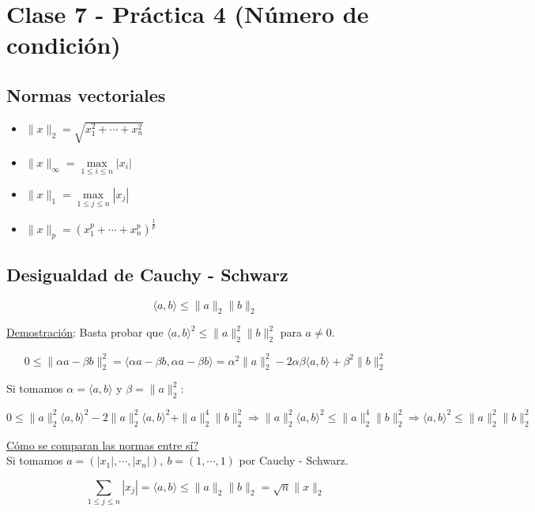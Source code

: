 \section{Clase 7 - Pr\'actica 4 (N\'umero de condici\'on)}

\subsection{Normas vectoriales}

\begin{itemize}
	\item $\|x\|_{2} = \sqrt{x_{1}^{2} + \cdots + x_{n}^{2}}$
	
	\item $\|x\|_{\infty} = \max \limits_{1 \leq i \leq n} |x_{i}|$

	\item $\|x\|_{1} = \max \limits_{1 \leq j \leq n} |x_{j}|$

	\item $\|x\|_{p} = (x_{1}^{p} + \cdots + x_{n}^{p})^{\frac{1}{p}}$
\end{itemize}

\subsection{Desigualdad de Cauchy - Schwarz}

$$\langle a, b \rangle \leq \|a\|_{2}\|b\|_{2}$$

\underline{Demostraci\'on}: Basta probar que $\langle a, b \rangle^{2}\leq \|a\|_{2}^{2}\|b\|_{2}^{2}$ para $a \neq 0$.

$$0 \leq \|\alpha a - \beta b\|_{2}^{2} = \langle \alpha a - \beta b, \alpha a - \beta b \rangle = \alpha^{2}\|a\|_{2}^{2} - 2\alpha \beta \langle a, b \rangle + \beta^{2}\|b\|_{2}^{2}$$

Si tomamos $\alpha = \langle a, b \rangle$ y $\beta = \|a\|_{2}^{2}$:

$$0 \leq \|a\|_{2}^{2}\langle a, b \rangle^{2} - 2\|a\|_{2}^{2}\langle a, b \rangle^{2} + \|a\|_{2}^{4}\|b\|_{2}^{2} \Rightarrow \|a\|_{2}^{2}\langle a, b \rangle^{2} \leq \|a\|_{2}^{4}\|b\|_{2}^{2} \Rightarrow \langle a, b \rangle^{2} \leq \|a\|_{2}^{2}\|b\|_{2}^{2}$$

\underline{C\'omo se comparan las normas entre s\'i?}\\

Si tomamos $a = (|x_{1}|, \cdots, |x_{n}|),\ b = (1, \cdots, 1)$ por Cauchy - Schwarz.

$$\sum \limits_{1 \leq j \leq n} |x_{j}| = \langle a, b \rangle \leq \|a\|_{2}\|b\|_{2} = \sqrt{n}\|x\|_{2}$$

